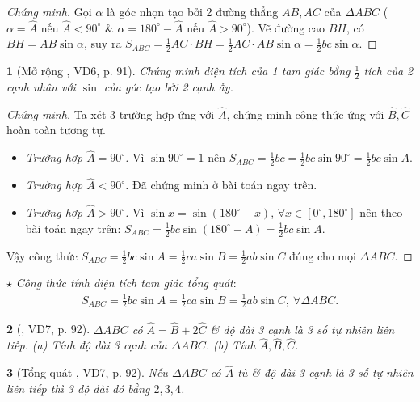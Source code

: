 \documentclass{article}
\newtheorem{baitoan}{}
\begin{document}
\begin{proof}[Chứng minh]
	Gọi $\alpha$ là góc nhọn tạo bởi 2 đường thẳng $AB,AC$ của $\Delta ABC$ ($\alpha = \widehat{A}$ nếu $\widehat{A} < 90^\circ$ \& $\alpha = 180^\circ - \widehat{A}$ nếu $\widehat{A} > 90^\circ$). Vẽ đường cao $BH$, có $BH = AB\sin\alpha$, suy ra $S_{ABC} = \frac{1}{2}AC\cdot BH = \frac{1}{2}AC\cdot AB\sin\alpha = \frac{1}{2}bc\sin\alpha$.
\end{proof}

\begin{baitoan}[Mở rộng \cite{Binh_Toan_9_tap_1}, VD6, p. 91]
	Chứng minh diện tích của 1 tam giác bằng $\frac{1}{2}$ tích của 2 cạnh nhân với $\sin$ của góc tạo bởi 2 cạnh ấy.
\end{baitoan}

\begin{proof}[Chứng minh]
	Ta xét 3 trường hợp ứng với $\widehat{A}$, chứng minh công thức ứng với $\widehat{B},\widehat{C}$ hoàn toàn tương tự.
	\begin{itemize}
		\item \textit{Trường hợp $\widehat{A} = 90^\circ$.} Vì $\sin90^\circ = 1$ nên $S_{ABC} = \frac{1}{2}bc = \frac{1}{2}bc\sin90^\circ = \frac{1}{2}bc\sin A$.
		\item \textit{Trường hợp $\widehat{A} < 90^\circ$.} Đã chứng minh ở bài toán ngay trên.
		\item \textit{Trường hợp $\widehat{A} > 90^\circ$.} Vì $\sin x = \sin(180^\circ - x)$, $\forall x\in[0^\circ,180^\circ]$ nên theo bài toán ngay trên: $S_{ABC} = \frac{1}{2}bc\sin(180^\circ - A) = \frac{1}{2}bc\sin A$.
	\end{itemize}
	Vậy công thức $S_{ABC} = \frac{1}{2}bc\sin A = \frac{1}{2}ca\sin B = \frac{1}{2}ab\sin C$ đúng cho mọi $\Delta ABC$.
\end{proof}
\noindent$\star$ \textit{Công thức tính diện tích tam giác tổng quát}:
\begin{align*}
	\boxed{S_{ABC} = \frac{1}{2}bc\sin A = \frac{1}{2}ca\sin B = \frac{1}{2}ab\sin C,\ \forall\Delta ABC.}
\end{align*}

\begin{baitoan}[\cite{Binh_Toan_9_tap_1}, VD7, p. 92]
	$\Delta ABC$ có $\widehat{A} = \widehat{B} + 2\widehat{C}$ \& độ dài 3 cạnh là 3 số tự nhiên liên tiếp. (a) Tính độ dài 3 cạnh của $\Delta ABC$. (b) Tính $\widehat{A},\widehat{B},\widehat{C}$.
\end{baitoan}

\begin{baitoan}[Tổng quát \cite{Binh_Toan_9_tap_1}, VD7, p. 92]
	Nếu $\Delta ABC$ có $\widehat{A}$ tù \& độ dài 3 cạnh là 3 số tự nhiên liên tiếp thì 3 độ dài đó bằng $2,3,4$.
\end{baitoan}
\end{document}
